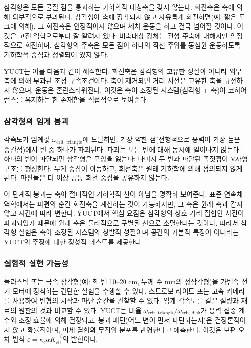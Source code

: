 \documentclass[12pt,a4paper]{article}
\begin{document}
	삼각형은 모든 물질 점을 통과하는 기하학적 대칭축을 갖지 않는다. 회전축은 축에 의해 외부적으로 부과된다. 삼각형이 축에 장착되지 않고 자유롭게 회전하면(예: 짧은 토크에 의해), 그 회전축은 안정적이지 않으며 세차 운동을 하고 결국 넘어질 것이다. 이것은 고전 역학으로부터 잘 알려져 있다: 비축대칭 강체는 관성 주축에 대해서만 안정적으로 회전하며, 삼각형의 주축은 모든 점이 하나의 직선 주위를 동심원 운동하도록 기하학적 중심과 정렬되어 있지 않다.
	
	YUCT는 이를 다음과 같이 해석한다: 회전축은 삼각형의 고유한 성질이 아니라 외부 축에 의해 부과된 조정 구속조건이다. 축이 제거되면 거리 사전은 고유한 축을 규정하지 않으며, 운동은 혼란스러워진다. 이것은 축이 조정된 시스템(삼각형 + 축)이 코히어런스를 유지하는 한 존재함을 직접적으로 보여준다.
	
	\subsubsection{삼각형의 임계 붕괴}
	
	각속도가 임계값 \(\omega_{\text{crit, triangle}}\)에 도달하면, 가장 약한 점(전형적으로 응력이 가장 높은 중간점)에서 변 중 하나가 파괴된다. 파괴는 모든 변에 대해 동시에 일어나지 않는다. 하나의 변이 파단되면 삼각형은 모양을 잃는다: 나머지 두 변과 파단된 꼭짓점이 V자형 구조를 형성한다. 무게 중심이 이동하고, 회전축은 원래 기하학에 의해 정의되지 않게 된다. 파편들은 더 이상 공통 회전 중심을 공유하지 않는다.
	
	이 단계적 붕괴는 축이 절대적인 기하학적 선이 아님을 명확히 보여준다. 표준 연속체 역학에서는 파편의 순간 회전축을 계산하는 것이 가능하지만, 그 축은 원래 축과 같지 않고 시간에 따라 변한다. YUCT에서 핵심 요점은 삼각형의 상호 거리 집합인 사전이 파괴되었기 때문에 원래 축은 물리적으로 구별된 선으로 소멸한다는 것이다. 따라서 삼각형 실험은 축이 조정된 시스템의 창발적 성질이며 공간의 기본적 특징이 아니라는 YUCT의 주장에 대한 정성적 테스트를 제공한다.
	
	\subsubsection{실험적 실현 가능성}
	
	플라스틱 또는 금속 삼각형(예: 한 변 10–20 cm, 두께 수 mm의 정삼각형)을 가변속 전기 모터에 장착하는 간단한 실험을 수행할 수 있다. 스트로보 라이트 또는 고속 카메라를 사용하여 변형의 시작과 파단 순간을 관찰할 수 있다. 임계 각속도를 같은 질량과 재료의 원판의 것과 비교할 수 있다. YUCT는 비율 \(\omega_{\text{crit, triangle}} / \omega_{\text{crit, disk}}\)가 응력 집중 계수와 조정 효율에 의해 결정되고, 붕괴 패턴(어느 변이 먼저 파단되는지)은 결정론적이지 않고 확률적이며, 미세 결함의 무작위 분포를 반영한다고 예측한다. 이것은 보편 오차 법칙 \(\varepsilon = \kappa_c \alpha K_{\mathrm{eff}}^{-\beta}\)의 발현이다.
	
\end{document}
